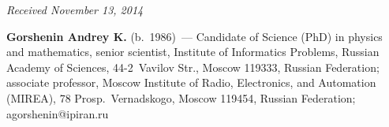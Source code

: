 \vspace*{-6pt}

\hfill{\small\textit{Received November 13, 2014}}

\vspace*{-18pt}


\Contrl

\noindent
\textbf{Gorshenin Andrey K.}  (b.\ 1986)~---
Candidate of Science (PhD) in physics and mathematics, senior scientist,
Institute of Informatics Problems, Russian Academy of Sciences,
44-2~Vavilov Str., Moscow 119333, Russian Federation;
associate professor, Moscow Institute of Radio, Electronics,
and Automation (MIREA), 78 Prosp.\ Vernadskogo, Moscow 119454, Russian Federation;
agorshenin@ipiran.ru

\label{end\stat}

\renewcommand{\bibname}{\protect\rm Литература}